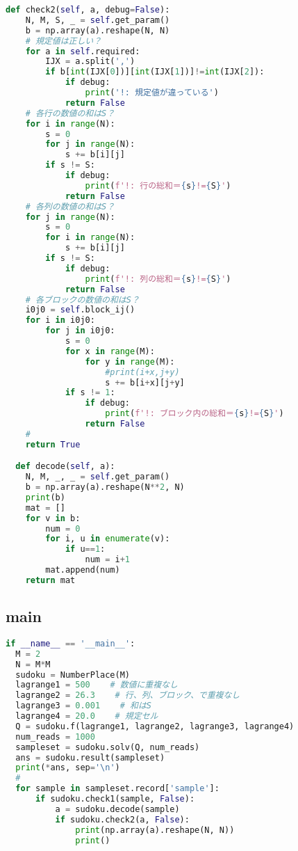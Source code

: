 \documentclass[uplatex,dvipdfmx,a4paper,11pt,oneside,openany]{jsbook}
\begin{document}
\begin{lstlisting}[language=Python]
  def check2(self, a, debug=False):
    N, M, S, _ = self.get_param()
    b = np.array(a).reshape(N, N)
    # 規定値は正しい？
    for a in self.required:
        IJX = a.split(',')
        if b[int(IJX[0])][int(IJX[1])]!=int(IJX[2]):
            if debug:
                print('!: 規定値が違っている')
            return False
    # 各行の数値の和はS？
    for i in range(N):
        s = 0
        for j in range(N):
            s += b[i][j]
        if s != S:
            if debug:
                print(f'!: 行の総和＝{s}!={S}')
            return False
    # 各列の数値の和はS？
    for j in range(N):
        s = 0
        for i in range(N):
            s += b[i][j]
        if s != S:
            if debug:
                print(f'!: 列の総和＝{s}!={S}')
            return False
    # 各ブロックの数値の和はS？
    i0j0 = self.block_ij()
    for i in i0j0:
        for j in i0j0:
            s = 0
            for x in range(M):
                for y in range(M):
                    #print(i+x,j+y)
                    s += b[i+x][j+y]
            if s != 1:
                if debug:
                    print(f'!: ブロック内の総和＝{s}!={S}')
                return False
    #
    return True

  def decode(self, a):
    N, M, _, _ = self.get_param()
    b = np.array(a).reshape(N**2, N)
    print(b)
    mat = []
    for v in b:
        num = 0
        for i, u in enumerate(v):
            if u==1:
                num = i+1
        mat.append(num)
    return mat
\end{lstlisting}

\subsection{main}

\begin{lstlisting}[language=Python]
if __name__ == '__main__':
  M = 2
  N = M*M
  sudoku = NumberPlace(M)
  lagrange1 = 500    # 数値に重複なし
  lagrange2 = 26.3    # 行、列、ブロック、で重複なし
  lagrange3 = 0.001    # 和はS
  lagrange4 = 20.0    # 規定セル
  Q = sudoku.f(lagrange1, lagrange2, lagrange3, lagrange4)
  num_reads = 1000
  sampleset = sudoku.solv(Q, num_reads)
  ans = sudoku.result(sampleset)
  print(*ans, sep='\n')
  #
  for sample in sampleset.record['sample']:
      if sudoku.check1(sample, False):
          a = sudoku.decode(sample)
          if sudoku.check2(a, False):
              print(np.array(a).reshape(N, N))
              print()
\end{lstlisting}
\end{document}
